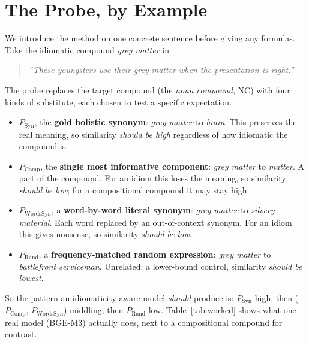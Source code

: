 \documentclass[11pt]{article}
\newcommand{\Syn}{P_{\mathrm{Syn}}}
\newcommand{\Comp}{P_{\mathrm{Comp}}}
\newcommand{\Words}{P_{\mathrm{WordsSyn}}}
\newcommand{\Rand}{P_{\mathrm{Rand}}}
\begin{document}
\section{The Probe, by Example}
\label{sec:probe}

We introduce the method on one concrete sentence before giving any formulas. Take the idiomatic
compound \emph{grey matter} in
\begin{quote}
\emph{``These youngsters use their grey matter when the presentation is right.''}
\end{quote}
The probe replaces the target compound (the \emph{noun compound}, NC) with four kinds of substitute,
each chosen to test a specific expectation.
\begin{itemize}
  \item $\Syn$, the \textbf{gold holistic synonym}: \emph{grey matter} to \emph{brain}. This
  preserves the real meaning, so similarity \emph{should be high} regardless of how idiomatic the
  compound is.
  \item $\Comp$, the \textbf{single most informative component}: \emph{grey matter} to \emph{matter}.
  A part of the compound. For an idiom this loses the meaning, so similarity \emph{should be low};
  for a compositional compound it may stay high.
  \item $\Words$, a \textbf{word-by-word literal synonym}: \emph{grey matter} to \emph{silvery
  material}. Each word replaced by an out-of-context synonym. For an idiom this gives nonsense, so
  similarity \emph{should be low}.
  \item $\Rand$, a \textbf{frequency-matched random expression}: \emph{grey matter} to
  \emph{battlefront serviceman}. Unrelated; a lower-bound control, similarity \emph{should be
  lowest}.
\end{itemize}

So the pattern an idiomaticity-aware model \emph{should} produce is: $\Syn$ high, then ($\Comp$,
$\Words$) middling, then $\Rand$ low. Table~\ref{tab:worked} shows what one real model (BGE-M3)
actually does, next to a compositional compound for contrast.
\end{document}
